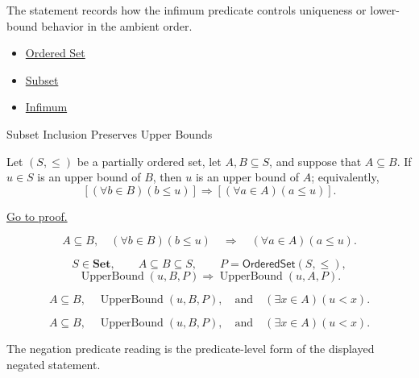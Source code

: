 \begin{remark*}[Interpretation]
The statement records how the infimum predicate controls uniqueness or lower-bound behavior in the ambient order.
\end{remark*}

\begin{dependencies}
\begin{itemize}
  \item \hyperref[def:ordered-set]{Ordered Set}
  \item \hyperref[def:subset]{Subset}
  \item \hyperref[def:infimum]{Infimum}
\end{itemize}
\end{dependencies}

\begin{lemmabox}{Subset Inclusion Preserves Upper Bounds}
\begin{lemma}
\label{lem:subset-inclusion-preserves-upper-bounds}
Let $(S,\leq)$ be a partially ordered set, let $A,B\subseteq S$, and suppose
that $A\subseteq B$. If $u\in S$ is an upper bound of $B$, then $u$ is an
upper bound of $A$; equivalently,
\[
  \left[(\forall b\in B)(b\leq u)\right]
  \Longrightarrow
  \left[(\forall a\in A)(a\leq u)\right].
\]

\hyperref[prf:subset-inclusion-preserves-upper-bounds]{Go to proof.}
\end{lemma}
\end{lemmabox}

\begin{remark*}
\[
  A\subseteq B,\quad
  (\forall b\in B)(b\leq u)
  \quad\Longrightarrow\quad
  (\forall a\in A)(a\leq u).
\]
\end{remark*}

\begin{remark*}
\[
  S\in\mathbf{Set},\qquad A\subseteq B\subseteq S,\qquad P=\mathsf{OrderedSet}(S,\leq),
\]
\[
  \operatorname{UpperBound}(u,B,P)
  \Longrightarrow \operatorname{UpperBound}(u,A,P).
\]
\end{remark*}

\begin{remark*}
\[
  A\subseteq B,\quad \operatorname{UpperBound}(u,B,P),
  \quad\text{and}\quad
  (\exists x\in A)(u<x).
\]
\end{remark*}

\begin{remark*}
\[
  A\subseteq B,\quad \operatorname{UpperBound}(u,B,P),
  \quad\text{and}\quad
  (\exists x\in A)(u<x).
\]

The negation predicate reading is the predicate-level form of the displayed negated statement.
\end{remark*}

